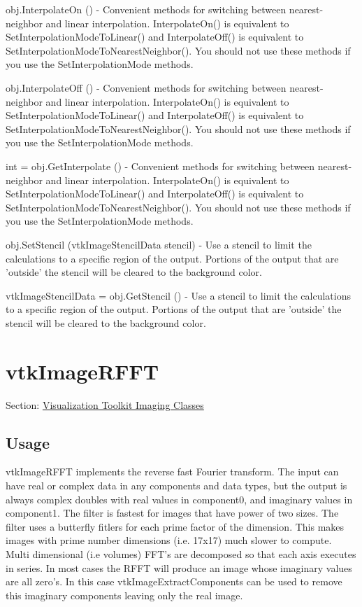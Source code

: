 \begin{DoxyItemize}
\item {\ttfamily obj.\-Interpolate\-On ()} -\/ Convenient methods for switching between nearest-\/neighbor and linear interpolation. Interpolate\-On() is equivalent to Set\-Interpolation\-Mode\-To\-Linear() and Interpolate\-Off() is equivalent to Set\-Interpolation\-Mode\-To\-Nearest\-Neighbor(). You should not use these methods if you use the Set\-Interpolation\-Mode methods.  
\item {\ttfamily obj.\-Interpolate\-Off ()} -\/ Convenient methods for switching between nearest-\/neighbor and linear interpolation. Interpolate\-On() is equivalent to Set\-Interpolation\-Mode\-To\-Linear() and Interpolate\-Off() is equivalent to Set\-Interpolation\-Mode\-To\-Nearest\-Neighbor(). You should not use these methods if you use the Set\-Interpolation\-Mode methods.  
\item {\ttfamily int = obj.\-Get\-Interpolate ()} -\/ Convenient methods for switching between nearest-\/neighbor and linear interpolation. Interpolate\-On() is equivalent to Set\-Interpolation\-Mode\-To\-Linear() and Interpolate\-Off() is equivalent to Set\-Interpolation\-Mode\-To\-Nearest\-Neighbor(). You should not use these methods if you use the Set\-Interpolation\-Mode methods.  
\item {\ttfamily obj.\-Set\-Stencil (vtk\-Image\-Stencil\-Data stencil)} -\/ Use a stencil to limit the calculations to a specific region of the output. Portions of the output that are 'outside' the stencil will be cleared to the background color.  
\item {\ttfamily vtk\-Image\-Stencil\-Data = obj.\-Get\-Stencil ()} -\/ Use a stencil to limit the calculations to a specific region of the output. Portions of the output that are 'outside' the stencil will be cleared to the background color.  
\end{DoxyItemize}\hypertarget{vtkimaging_vtkimagerfft}{}\section{vtk\-Image\-R\-F\-F\-T}\label{vtkimaging_vtkimagerfft}
Section\-: \hyperlink{sec_vtkimaging}{Visualization Toolkit Imaging Classes} \hypertarget{vtkwidgets_vtkxyplotwidget_Usage}{}\subsection{Usage}\label{vtkwidgets_vtkxyplotwidget_Usage}
vtk\-Image\-R\-F\-F\-T implements the reverse fast Fourier transform. The input can have real or complex data in any components and data types, but the output is always complex doubles with real values in component0, and imaginary values in component1. The filter is fastest for images that have power of two sizes. The filter uses a butterfly fitlers for each prime factor of the dimension. This makes images with prime number dimensions (i.\-e. 17x17) much slower to compute. Multi dimensional (i.\-e volumes) F\-F\-T's are decomposed so that each axis executes in series. In most cases the R\-F\-F\-T will produce an image whose imaginary values are all zero's. In this case vtk\-Image\-Extract\-Components can be used to remove this imaginary components leaving only the real image.

